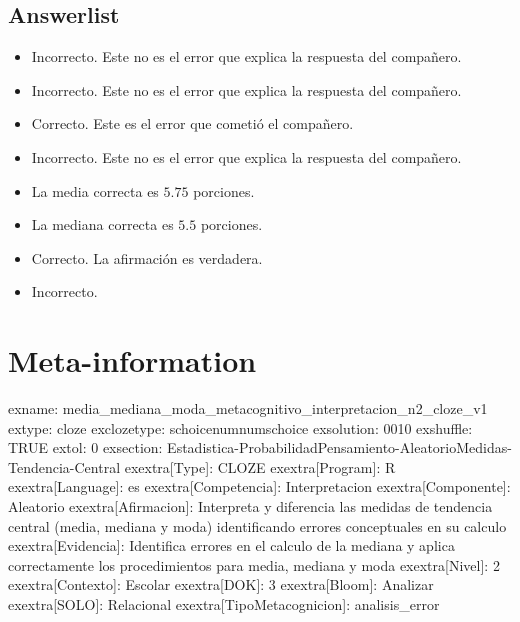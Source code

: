 \documentclass[
]{article}
\providecommand{\tightlist}{%
  \setlength{\itemsep}{0pt}\setlength{\parskip}{0pt}}
\begin{document}
\subsection{Answerlist}\label{answerlist-1}

\begin{itemize}
\tightlist
\item
  Incorrecto. Este no es el error que explica la respuesta del
  compañero.
\item
  Incorrecto. Este no es el error que explica la respuesta del
  compañero.
\item
  Correcto. Este es el error que cometió el compañero.
\item
  Incorrecto. Este no es el error que explica la respuesta del
  compañero.
\item
  La media correcta es \(5.75\) porciones.
\item
  La mediana correcta es \(5.5\) porciones.
\item
  Correcto. La afirmación es verdadera.
\item
  Incorrecto.
\end{itemize}

\section{Meta-information}\label{meta-information}

exname:
media\_mediana\_moda\_metacognitivo\_interpretacion\_n2\_cloze\_v1
extype: cloze exclozetype:
schoice\textbar num\textbar num\textbar schoice exsolution:
0010 exshuffle: TRUE extol:
0 exsection:
Estadistica-Probabilidad\textbar Pensamiento-Aleatorio\textbar Medidas-Tendencia-Central
exextra{[}Type{]}: CLOZE exextra{[}Program{]}: R exextra{[}Language{]}:
es exextra{[}Competencia{]}: Interpretacion exextra{[}Componente{]}:
Aleatorio exextra{[}Afirmacion{]}: Interpreta y diferencia las medidas
de tendencia central (media, mediana y moda) identificando errores
conceptuales en su calculo exextra{[}Evidencia{]}: Identifica errores en
el calculo de la mediana y aplica correctamente los procedimientos para
media, mediana y moda exextra{[}Nivel{]}: 2 exextra{[}Contexto{]}:
Escolar exextra{[}DOK{]}: 3 exextra{[}Bloom{]}: Analizar
exextra{[}SOLO{]}: Relacional exextra{[}TipoMetacognicion{]}:
analisis\_error
\end{document}
